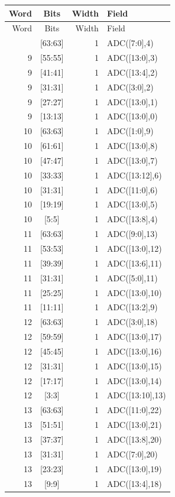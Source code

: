 \begin{longtable}{@{}r c r p{9.5cm}@{}}
\toprule
Word & Bits & Width & Field \\
\midrule
\endfirsthead
\toprule
Word & Bits & Width & Field \\
\midrule
\endhead
\bottomrule
\endfoot
9 & [63:63] & 1 & ADC([7:0],4) \\
9 & [55:55] & 1 & ADC([13:0],3) \\
9 & [41:41] & 1 & ADC([13:4],2) \\
9 & [31:31] & 1 & ADC([3:0],2) \\
9 & [27:27] & 1 & ADC([13:0],1) \\
9 & [13:13] & 1 & ADC([13:0],0) \\
10 & [63:63] & 1 & ADC([1:0],9) \\
10 & [61:61] & 1 & ADC([13:0],8) \\
10 & [47:47] & 1 & ADC([13:0],7) \\
10 & [33:33] & 1 & ADC([13:12],6) \\
10 & [31:31] & 1 & ADC([11:0],6) \\
10 & [19:19] & 1 & ADC([13:0],5) \\
10 & [5:5] & 1 & ADC([13:8],4) \\
11 & [63:63] & 1 & ADC([9:0],13) \\
11 & [53:53] & 1 & ADC([13:0],12) \\
11 & [39:39] & 1 & ADC([13:6],11) \\
11 & [31:31] & 1 & ADC([5:0],11) \\
11 & [25:25] & 1 & ADC([13:0],10) \\
11 & [11:11] & 1 & ADC([13:2],9) \\
12 & [63:63] & 1 & ADC([3:0],18) \\
12 & [59:59] & 1 & ADC([13:0],17) \\
12 & [45:45] & 1 & ADC([13:0],16) \\
12 & [31:31] & 1 & ADC([13:0],15) \\
12 & [17:17] & 1 & ADC([13:0],14) \\
12 & [3:3] & 1 & ADC([13:10],13) \\
13 & [63:63] & 1 & ADC([11:0],22) \\
13 & [51:51] & 1 & ADC([13:0],21) \\
13 & [37:37] & 1 & ADC([13:8],20) \\
13 & [31:31] & 1 & ADC([7:0],20) \\
13 & [23:23] & 1 & ADC([13:0],19) \\
13 & [9:9] & 1 & ADC([13:4],18) \\

\end{longtable}
